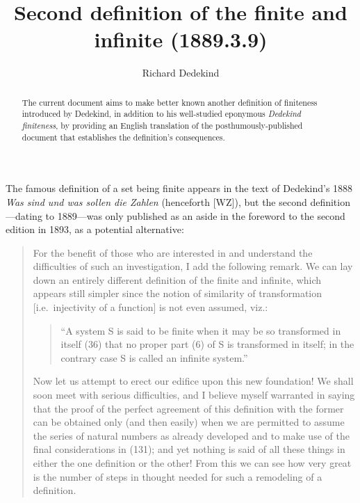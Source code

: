 \documentclass[leqno,hidelinks,10pt]{article}
\theoremstyle{definition}
\begin{document}
\hypersetup{pageanchor=false}

\title{Second definition of the finite and infinite (1889.3.9)}
\author{Richard Dedekind}
\date{\phantom{} }

\maketitle
\thispagestyle{empty}

\begin{abstract}
The current document aims to make better known another definition of finiteness introduced by Dedekind, in addition to his well-studied eponymous \emph{Dedekind finiteness}, by providing an English translation of the posthumously-published document that establishes the definition's consequences.
    \end{abstract}

The famous definition of a set being finite appears in the text of Dedekind's 1888 \emph{Was sind und was sollen die Zahlen} (henceforth [WZ]), but the second definition---dating to 1889---was only published as an aside in the foreword to the second edition in 1893, as a potential alternative:

\begin{quote}
 For the benefit of those who are interested in and understand the difficulties of such an investigation, I add the following remark. We can lay down an entirely different definition of the finite and infinite, which appears still simpler since the notion of similarity of transformation [i.e.\ injectivity of a function] is not even assumed, viz.:
 \begin{quote}
 ``A system S is said to be finite when it may be so transformed in itself (36) that no proper part (6) of S is transformed in itself; in the contrary case S is called an infinite system.''
 \end{quote}
 Now let us attempt to erect our edifice upon this new foundation! 
 We shall soon meet with serious difficulties, and I believe myself warranted in saying that the proof of the perfect agreement of this definition with the former can be obtained only (and then easily) when we are permitted to assume the series of natural numbers as already developed and to make use of the final considerations in (131); and yet nothing is said of all these things in either the one definition or the other! 
 From this we can see how very great is the number of steps in thought needed for such a remodeling of a definition.
\end{quote}
\end{document}
